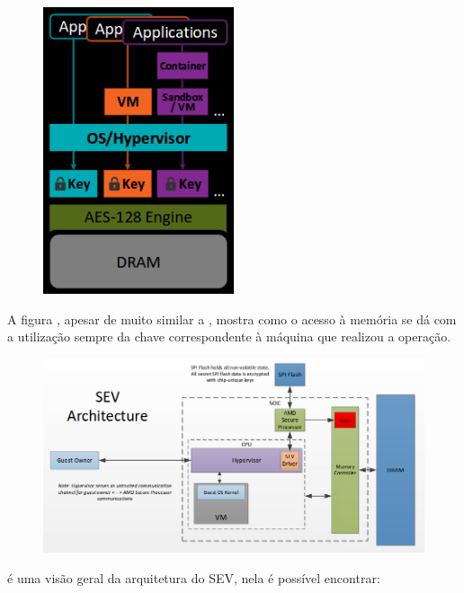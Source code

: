 \documentclass{report}
\begin{document}
\begin{figure}[h]
    \centering
    \includegraphics[width=0.5\textwidth]{img/sev}
    \label{sev}
\end{figure}

A figura \label{sev}, apesar de muito similar a \label{sme}, mostra como o
acesso à memória se dá com a utilização sempre da chave correspondente à
máquina que realizou a operação.


\begin{figure}[h]
    \centering
    \includegraphics[width=1\textwidth]{img/sev-architecture}
    \label{sev-architecture}
\end{figure}

\label{sev-architecture} é uma visão geral da arquitetura do SEV, nela é possível encontrar:
\end{document}
